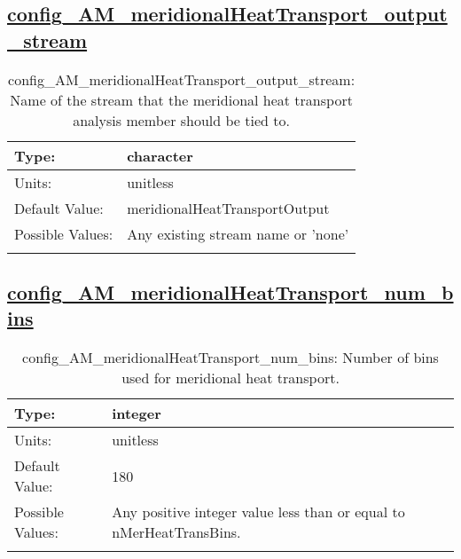 \subsection[config\_AM\_meridionalHeatTransport\_output\_stream]{\hyperref[sec:nm_tab_AM_meridionalHeatTransport]{config\_AM\_meridionalHeatTransport\_output\_stream}}
\label{subsec:nm_sec_config_AM_meridionalHeatTransport_output_stream}
\begin{center}
\begin{longtable}{| p{2.0in} || p{4.0in} |}
    \hline
    Type: & character \\
    \hline
    Units: & \si{unitless} \\
    \hline
    Default Value: & meridionalHeatTransportOutput \\
    \hline
    Possible Values: & Any existing stream name or 'none' \\
    \hline
    \caption{config\_AM\_meridionalHeatTransport\_output\_stream: Name of the stream that the meridional heat transport analysis member should be tied to.}
\end{longtable}
\end{center}
\subsection[config\_AM\_meridionalHeatTransport\_num\_bins]{\hyperref[sec:nm_tab_AM_meridionalHeatTransport]{config\_AM\_meridionalHeatTransport\_num\_bins}}
\label{subsec:nm_sec_config_AM_meridionalHeatTransport_num_bins}
\begin{center}
\begin{longtable}{| p{2.0in} || p{4.0in} |}
    \hline
    Type: & integer \\
    \hline
    Units: & \si{unitless} \\
    \hline
    Default Value: & 180 \\
    \hline
    Possible Values: & Any positive integer value less than or equal to nMerHeatTransBins. \\
    \hline
    \caption{config\_AM\_meridionalHeatTransport\_num\_bins: Number of bins used for meridional heat transport.}
\end{longtable}
\end{center}
